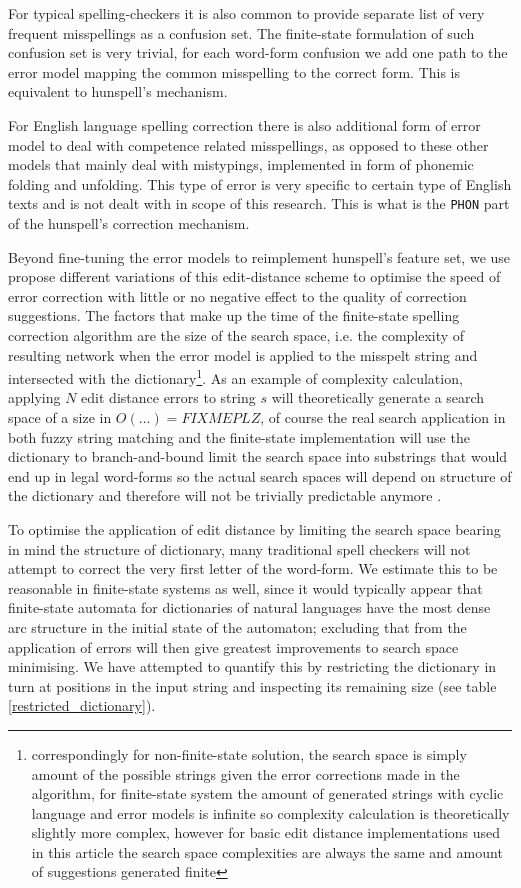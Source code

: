 \documentclass[11pt]{article}
\begin{document}
For typical spelling-checkers it is also common to provide separate list of
very frequent misspellings as a confusion set. The finite-state formulation
of such confusion set is very trivial, for each word-form confusion we add
one path to the error model mapping the common misspelling to the correct
form. This is equivalent to hunspell's \texttt{} mechanism.

For English language spelling correction there is also additional form of
error model to deal with competence related misspellings, as opposed to these
other models that mainly deal with mistypings, implemented in form of phonemic
folding and unfolding. This type of error is very specific to certain type of
English texts and is not dealt with in scope of this research. This is what is
the \texttt{PHON} part of the hunspell's correction mechanism.

Beyond fine-tuning the error models to reimplement hunspell's feature set, we
use propose different variations of this edit-distance scheme to optimise the
speed of error correction with little or no negative effect to the quality of
correction suggestions. The factors that make up the time of the finite-state
spelling correction algorithm are the size of the search space, i.e. the
complexity of resulting network when the error model is applied to the misspelt
string and intersected with the dictionary\footnote{correspondingly for
non-finite-state solution, the search space is simply amount of the possible
strings given the error corrections made in the algorithm, for finite-state
system the amount of generated strings with cyclic language and error models is
infinite so complexity calculation is theoretically slightly more complex,
however for basic edit distance implementations used in this article the search
space complexities are always the same and amount of suggestions generated
finite}. As an example of complexity calculation, applying $N$ edit distance
errors to string $s$ will theoretically generate a search space of a size in
$O(...) = FIXME PLZ$, \cite{mitankin/2005} of course the real search
application in both fuzzy string matching and the finite-state implementation
will use the dictionary to branch-and-bound limit the search space into
substrings that would end up in legal word-forms so the actual search spaces
will depend on structure of the dictionary and therefore will not be trivially
predictable anymore .

To optimise the application of edit distance by limiting the search space
bearing in mind the structure of dictionary, many traditional spell checkers
will not attempt to correct the very first letter of the word-form. We estimate
this to be reasonable in finite-state systems as well, since it would typically
appear that finite-state automata for dictionaries of natural languages have
the most dense arc structure in the initial state of the automaton; excluding
that from the application of errors will then give greatest improvements to
search space minimising. We have attempted to quantify this by restricting
the dictionary in turn at positions in the input string and inspecting
its remaining size (see table \ref{restricted_dictionary}).
\end{document}
